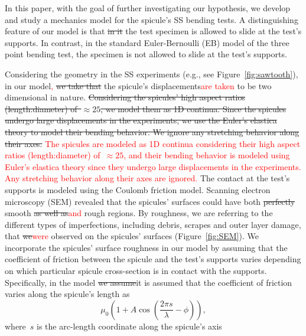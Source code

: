 \documentclass[preprint,10pt,times]{elsarticle}
\numberwithin{equation}{section}
\begin{document}
In this paper, with the goal of further investigating our hypothesis,
we develop and study a mechanics model for the spicule's SS bending
tests. A distinguishing feature of our model is that \sout{in it} the test
specimen is allowed to slide at the test's supports. In contrast,
in the standard Euler-Bernoulli (EB) model of the three point bending
test, the specimen is not allowed to slide at the test's supports.

\medskip{}

Considering the geometry in the SS experiments\textcolor{violet}{{}
}(e.g., see Figure~\ref{fig:sawtooth}), in our model\textcolor{red}{,} \sout{we take that}
the spicule's displacements\textcolor{red}{are taken} to be two dimensional in nature. \sout{Considering
the spicules' high aspect ratios (length:diameter) of~$\approx 25$,
we model them as 1D continua. Since the spicules undergo large displacements
in the experiments, we use the Euler's elastica theory to model their
bending behavior. We ignore any stretching behavior along their axes.}
\textcolor{red}{The spicules are modeled as 1D continua considering their high aspect ratios (length:diameter) of~$\approx 25$, and their bending behavior is modeled using Euler's elastica theory since they undergo large displacements in the experiments. Any stretching behavior along their axes are ignored.}
The contact at the test's supports is modeled using the Coulomb friction
model. Scanning electron microscopy (SEM) revealed that the spicules'
surfaces could have both \sout{perfectly} smooth \sout{as well as}\textcolor{red}{and} rough regions.
By roughness, we are referring to the different types of imperfections,
including debris, scrapes and outer layer damage, that \sout{we}\textcolor{red}{were} observed
on the spicules' surfaces (Figure~\ref{fig:SEM}). We incorporate
the spicules' surface roughness in our model by assuming that the
coefficient of friction between the spicule and the test's supports
varies depending on which particular spicule cross-section is in contact
with the supports. Specifically, in the model \sout{we assume}{it is assumed} that the coefficient
of friction varies along the spicule's length  as
\begin{equation}
\mu_{0}\left(1+A\cos\left(\frac{ 2 \pi s}{\lambda}-\phi\right)\right),\label{eq:muofS1}
\end{equation}
where~$s$ is the arc-length coordinate along the spicule's axis
\end{document}

